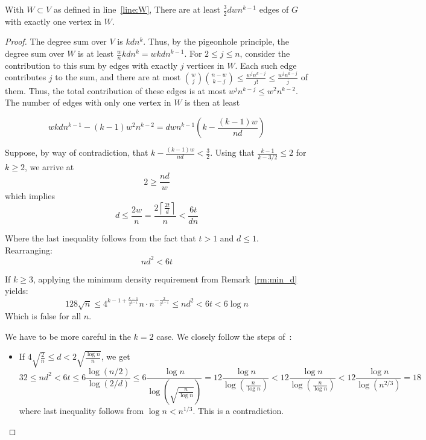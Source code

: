 \begin{lemma}\label{lm:many_edges}
    With $W  \subset V$ as defined in line~\ref{line:W},
    There are at least $\frac{3}{2}dwn^{k-1}$ edges of $G$ with exactly one vertex in $W$.
    \begin{proof}
        The degree sum over $V$ is $kdn^{k}$.
        Thus, by the pigeonhole principle, the degree sum over $W$ is at least
        $\frac{w}{n}kdn^{k} = wkdn^{k-1}$.
        For $2 \leq j \leq n$,
        consider the contribution to this sum by edges with exactly $j$ vertices in $W$.
        Each such edge contributes $j$ to the sum, and there are at most
        $\binom{w}{j}\binom{n-w}{k-j} \leq
        \frac{w^j n^{k-j}}{j!} \leq
        \frac{w^j n^{k-j}}{j}$ of them.
        Thus, the total contribution of these edges is at most $w^j n^{k-j} \leq w^{2}n^{k-2}$.
        The number of edges with only one vertex in $W$ is then at least

        \[
            wkdn^{k-1} - (k-1)w^{2}n^{k-2} = dwn^{k-1} \left( k - \frac{(k-1)w}{nd}\right)
        \]

        Suppose, by way of contradiction,
        that $ k - \frac{(k-1)w}{nd} < \frac{3}{2}$.
        Using that $\frac{k-1}{k-3/2} \leq 2$
        for $k \geq 2$, we arrive at
        \[
             2 \geq  \frac{nd}{w}
        \]
        which implies
        \[
            d \leq \frac{2w}{n} = \frac{2 \left\lceil\frac{2t}{d} \right\rceil}{n}
            < \frac{6t}{dn}
        \]

        Where the last inequality follows from the fact that $t > 1$ and $d \leq 1$.
        Rearranging:
        \[
            nd^2 < 6t
        \]

        If $k \geq 3$, applying the minimum density requirement from Remark~\ref{rm:min_d} yields:
        \[
            128 \sqrt {n} \leq
            4^{k-1 + \frac{k-1}{2^{k-1}}} n \cdot n^{-\frac{2}{2^{k-1}}} \leq
            nd^2 < 6t < 6 \log n
        \]
        Which is false for all $n$.

        We have to be more careful in the $k = 2$ case.
        We closely follow the steps of~\cite{MUBAYI2010174}:
        \begin{itemize}
            \item If $4 \sqrt{\frac{2}{n}} \leq d < 2 \sqrt{\frac{\log n}{n}}$, we get
            \[
                32 \leq nd^2
                < 6t \leq
                6 \frac{\log (n/2)}{\log(2/d) } \leq
                6 \frac{\log n}{\log\left(\sqrt{\frac{n}{\log n}}\right)} =
                12 \frac{\log n}{{\log \left( \frac{n}{\log n} \right)}} <
                12 \frac{\log n}{{\log \left( \frac{n}{\log n} \right)}} <
                12 \frac{\log n}{{\log \left( n^{2/3} \right)}} =
                18
            \]
            where last inequality follows from $\log n < n^{1/3}$.
            This is a contradiction.


\end{itemize}
\end{proof}
\end{lemma}
